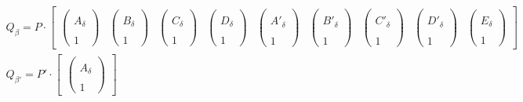 \begin{gather}		
Q_\beta =	
P \cdot	
\begin{bmatrix}
\begin{pmatrix}
\\A_\delta\\\\1
\end{pmatrix}&
\begin{pmatrix}
\\B_\delta\\\\1
\end{pmatrix}&
\begin{pmatrix}
\\C_\delta\\\\1
\end{pmatrix}&
\begin{pmatrix}
\\D_\delta\\\\1
\end{pmatrix}&
\begin{pmatrix}
\\A'_\delta\\\\1
\end{pmatrix}&
\begin{pmatrix}
\\B'_\delta\\\\1
\end{pmatrix}&
\begin{pmatrix}
\\C'_\delta\\\\1
\end{pmatrix}&
\begin{pmatrix}
\\D'_\delta\\\\1
\end{pmatrix}&
\begin{pmatrix}
\\E_\delta\\\\1
\end{pmatrix}
\end{bmatrix}\\
Q_{\beta'} =	
P' \cdot	
\begin{bmatrix}
\begin{pmatrix}
\\A_\delta\\\\1

\end{pmatrix}
\end{bmatrix}
\end{gather}
